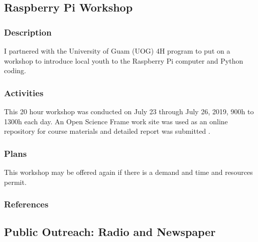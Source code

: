 \subsection{Raspberry Pi Workshop}
\begin{refsection}
	
\subsubsection{Description}

I partnered with the University of Guam (UOG) 4H program to put on a workshop to introduce local youth to the Raspberry Pi computer and Python coding. 

\subsubsection{Activities}

This 20 hour workshop was conducted on July 23 through July 26, 2019, 900h to 1300h each day. An Open Science Frame work site was used as an online repository for course materials \cite{moore_open_2018} and detailed report was submitted \cite{moore_report_2019-1}.

\subsubsection{Plans}

This workshop may be offered again if there is a demand and time and resources permit.

\subsubsection{References}
\printbibliography[heading=none]
\end{refsection}
	

\subsection{Public Outreach: Radio and Newspaper}

\begin{refsection}
	\nocite{*}
	\printbibliography[filter=press, heading=none]
\end{refsection} 

